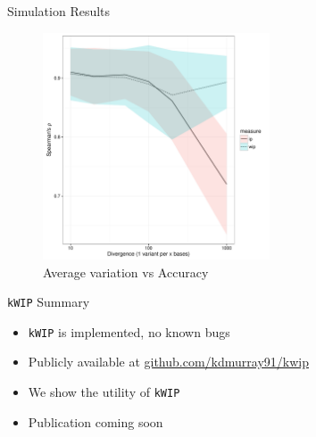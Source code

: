 \documentclass[t]{beamer}
\begin{document}
\begin{frame}{Simulation Results}
  \begin{figure}
    \centering
    \includegraphics[width=0.6\textwidth]{img/variation_vs_accuracy.pdf}
    \caption{Average variation vs Accuracy}
  \end{figure}
\end{frame}

\begin{frame}{\texttt{kWIP} Summary}
  \begin{itemize}
    \item \texttt{kWIP} is implemented, no known bugs
    \item Publicly available at \url{github.com/kdmurray91/kwip}
    \item We show the utility of \texttt{kWIP}
    \item Publication coming soon
  \end{itemize}
\end{frame}
\end{document}
